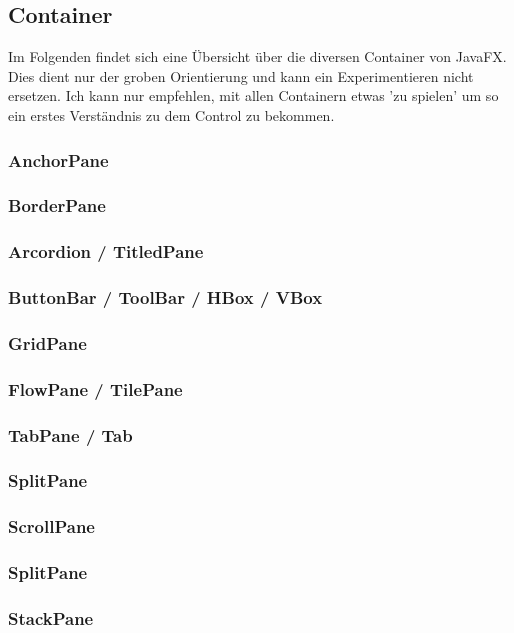 \subsection{Container}
Im Folgenden findet sich eine Übersicht über die diversen Container von JavaFX. Dies dient nur der groben Orientierung
und kann ein Experimentieren nicht ersetzen. Ich kann nur empfehlen, mit allen Containern etwas 'zu spielen' um so ein
erstes Verständnis zu dem Control zu bekommen.

\subsubsection{AnchorPane}


\subsubsection{BorderPane}

\subsubsection{Arcordion / TitledPane}

\subsubsection{ButtonBar / ToolBar / HBox / VBox}

\subsubsection{GridPane}

\subsubsection{FlowPane / TilePane}

\subsubsection{TabPane / Tab}

\subsubsection{SplitPane}

\subsubsection{ScrollPane}

\subsubsection{SplitPane}

\subsubsection{StackPane}

